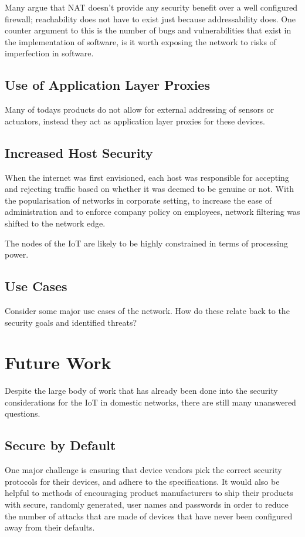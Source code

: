 \documentclass[10pt,journal,compsoc]{IEEEtran}
\begin{document}
Many argue that NAT doesn't provide any security benefit over a well configured
firewall; reachability does not have to exist just because addressability does.
One counter argument to this is the number of bugs and vulnerabilities that
exist in the implementation of software, is it worth exposing the network to
risks of imperfection in software.

\subsection{Use of Application Layer Proxies}
Many of todays products do not allow for external addressing of sensors or
actuators, instead they act as application layer proxies for these devices.  

\subsection{Increased Host Security}
When the internet was first envisioned, each host was responsible for accepting
and rejecting traffic based on whether it was deemed to be genuine or not. With
the popularisation of networks in corporate setting, to increase the ease of
administration and to enforce company policy on employees, network filtering
was shifted to the network edge.

The nodes of the IoT are likely to be highly constrained in terms of processing
power. 

\subsection{Use Cases}
Consider some major use cases of the network.
How do these relate back to the security goals and identified threats?


\section{Future Work}
Despite the large body of work that has already been done into the security
considerations for the IoT in domestic networks, there are still many
unanswered questions. 

\subsection{Secure by Default}
One major challenge is ensuring that device vendors pick the correct security
protocols for their devices, and adhere to the specifications. It would also be
helpful to methods of encouraging product manufacturers to ship their products
with secure, randomly generated, user names and passwords in order to reduce
the number of attacks that are made of devices that have never been configured
away from their defaults.
\end{document}
